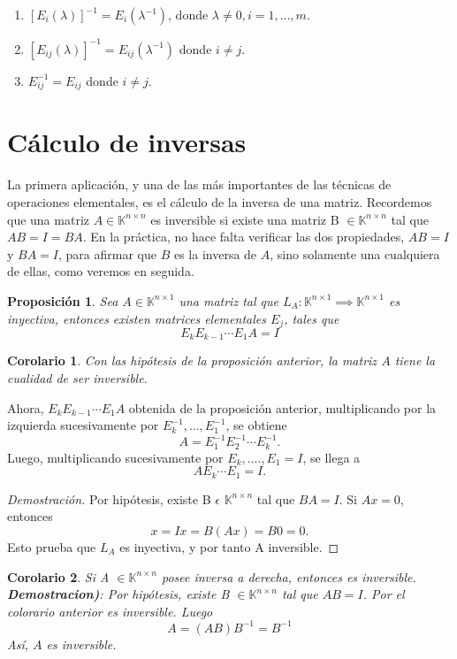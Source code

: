\documentclass[b5paper, 11pt]{book}
\newcommand{\0}{\mathbf{0}}
\newcommand{\K}{\mathds{K}}
\theoremstyle{estiloB}
\theoremstyle{estiloC}
\theoremstyle{estiloD}
\newtheorem{propo}{Proposición}[chapter]
\newtheorem{coro}{Corolario}[chapter]
\theoremstyle{estiloE}
\begin{document}
\begin{enumerate}
\begin{enumerate}
\item $[E_i(\lambda)]^{-1}=E_i(\lambda^{-1})$, donde $\lambda \not= 0, i=1,\ldots ,m.$
\item $[E_{ij}(\lambda)]^{-1}=E_{ij}(\lambda^{-1})$ donde $i\not=j$.
\item $ E_{ij}^{-1}= E_{ij}$ donde $i\not=j$.
\end{enumerate}
\end{enumerate}

\section{Cálculo de inversas}
La primera aplicaci\'{o}n, y una de las m\'{a}s importantes de las t\'{e}cnicas de operaciones elementales, es el c\'{a}lculo de la inversa de una matriz. Recordemos que una matriz $A \in \K^{n \times n}$ es inversible si existe una matriz B $\in \K^{n \times n}$ tal que $AB = I = BA$. En la pr\'{a}ctica, no hace falta verificar las dos propiedades, $AB=I$ y $BA=I$, para afirmar que $B$ es la inversa de $A$, sino solamente una cualquiera de ellas, como veremos en seguida.
\begin{propo}
Sea $A \in \K^{n \times 1}$ una matriz tal que $L_A: \K^{n \times 1}\implies \K^{n \times 1}$ es inyectiva, entonces existen matrices elementales $E_j$, tales que $$ E_{k}E_{k-1} \cdots E_{1}A=I $$ 
\end{propo}
\begin{coro}
Con las hip\'{o}tesis de la proposici\'{o}n anterior, la matriz $A$ tiene la cualidad de ser inversible.
\end{coro}
Ahora, $E_{k}E_{k-1} \cdots E_{1}A$ obtenida de la proposici\'{o}n anterior, multiplicando por la izquierda sucesivamente por $E_{k}^{-1}, \ldots ,E_1^{-1}$, se obtiene $$A = E_{1}^{-1}E_{2}^{-1} \cdots E_{k}^{-1}.$$
Luego, multiplicando sucesivamente por $E_k,....,E_1 = I$, se llega a $$ AE_k \cdots E_1 = I.$$
\begin{proof}[Demostración] Por hip\'{o}tesis, existe B $\epsilon$  $\K^{n \times n}$ tal que $ BA = I $. Si $Ax = 0$, entonces $$ x = Ix = B(Ax) = B0 = 0.$$ Esto prueba que $L_A$ es inyectiva, y por tanto A inversible.
\end{proof}

\begin{coro}
Si A $\in \K^{n \times n}$ posee inversa a derecha, entonces es inversible.\\\textbf{\textit{Demostracion})}: Por hip\'{o}tesis, existe B $\in \K^{n \times n}$ tal que $AB = I$. Por el colorario anterior es inversible. Luego $$ A = (AB)B^{-1} = B^{-1} $$ As\'{i}, $A$ es inversible.
\end{coro}
\end{document}
